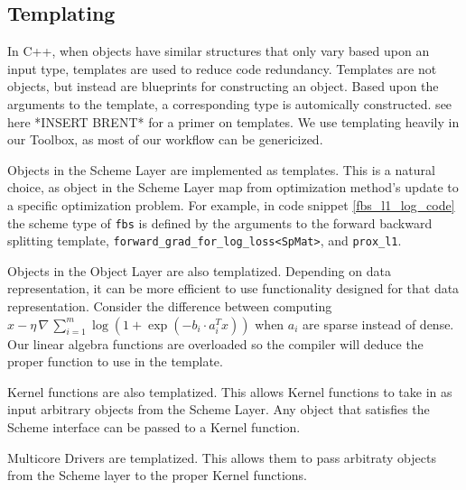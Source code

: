 \subsection{Templating}

In C++, when objects have similar structures that only vary based upon an input type, templates are used to reduce code redundancy.
Templates are not objects, but instead are blueprints for constructing an object.
Based upon the arguments to the template, a corresponding type is automically constructed. see here *INSERT BRENT* for a primer on templates.
We use templating heavily in our Toolbox, as most of our workflow can be genericized.

Objects in the Scheme Layer are implemented as templates.
This is a natural choice, as object in the Scheme Layer map from optimization method's update to a specific optimization problem.
For example, in code snippet \ref{fbs_l1_log_code} the scheme type of \texttt{fbs} is defined by the arguments to the forward backward splitting template, \texttt{forward\_grad\_for\_log\_loss<SpMat>}, and \texttt{prox\_l1}.

Objects in the Object Layer are also templatized. Depending on data representation, it can be more efficient to use functionality designed for that data representation. Consider the difference between computing $x - \eta \, \nabla \,\sum_{i = 1}^m \log (1 + \exp(-b_i \cdot a_i^T x))$ when $a_i$ are sparse instead of dense.
Our linear algebra functions are overloaded so the compiler will deduce the proper function to use in the template.

Kernel functions are also templatized. This allows Kernel functions to take in as input arbitrary objects from the Scheme Layer. Any object that satisfies the Scheme interface can be passed to a Kernel function.

Multicore Drivers are templatized. This allows them to pass arbitraty objects from the Scheme layer to the proper Kernel functions.